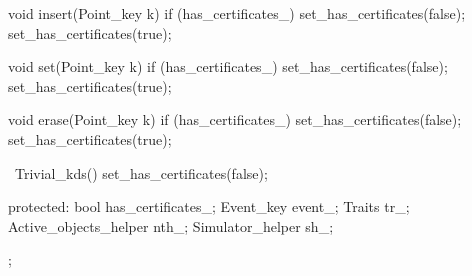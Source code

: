 \begin{ccExampleCode}
{  void insert(Point_key k) {
    if (has_certificates_) {
      set_has_certificates(false);
      set_has_certificates(true);
    }
  }

  void set(Point_key k) {
    if (has_certificates_) {
      set_has_certificates(false);
      set_has_certificates(true);
    }
  }

  void erase(Point_key k) {
    if (has_certificates_) {
      set_has_certificates(false);
      set_has_certificates(true);
    }
  }

  ~Trivial_kds(){
     set_has_certificates(false);
  }

protected:
  bool has_certificates_;
  Event_key event_;
  Traits tr_;
  Active_objects_helper nth_;
  Simulator_helper sh_;
};

\end{ccExampleCode}
